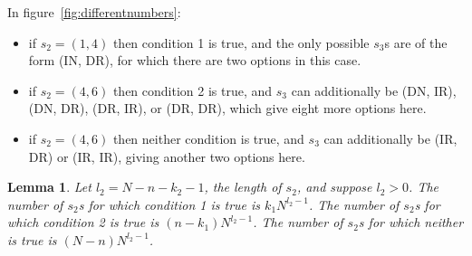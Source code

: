 \documentclass{article}
\newtheorem{lemma}{Lemma}[section]
\begin{document}
In figure~\ref{fig:differentnumbers}:
\begin{itemize}
    \item if $s_2=(1,4)$ then condition 1 is true, and the only possible $s_3$s are of the form (IN, DR), for which there are two options in this case.
    \item if $s_2=(4,6)$ then condition 2 is true, and $s_3$ can additionally be (DN, IR), (DN, DR), (DR, IR), or (DR, DR), which give eight more options here.
    \item if $s_2=(4,6)$ then neither condition is true, and $s_3$ can additionally be (IR, DR) or (IR, IR), giving another two options here.
\end{itemize}

    \begin{lemma}\label{l1}
    Let $l_2 = N-n-k_2-1$, the length of $s_2$, and suppose $l_2>0$. The number of $s_2$s for which condition 1 is true is $k_1N^{l_2-1}$. The number of $s_2$s for which condition 2 is true is $(n-k_1)N^{l_2-1}$. The number of $s_2$s for which neither is true is $(N-n)N^{l_2-1}$.
    \end{lemma}\label{lemmacount}
\end{document}
